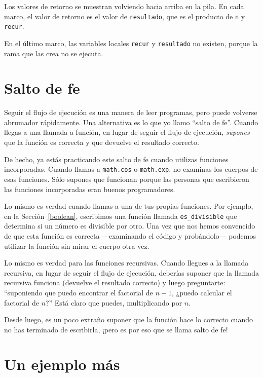 \documentclass[10pt]{book}
\begin{document}
Los valores de retorno se muestran volviendo hacia arriba en la pila.  En cada
marco, el valor de retorno es el valor de {\tt resultado}, que es el
producto de {\tt n} y {\tt recur}.

En el último marco, las variables
locales {\tt recur} y {\tt resultado} no existen, porque
la rama que las crea no se ejecuta.


\section{Salto de fe}

Seguir el flujo de ejecución es una manera de leer programas, pero
puede volverse abrumador rápidamente.  Una
alternativa es lo que yo llamo ``salto de fe''.  Cuando llegas a una
llamada a función, en lugar de seguir el flujo de ejecución, {\em
supones} que la función es correcta y que devuelve el resultado
correcto.

De hecho, ya estás practicando este salto de fe cuando utilizas
funciones incorporadas.  Cuando llamas a {\tt math.cos} o {\tt math.exp},
no examinas los cuerpos de esas funciones.  Sólo
supones que funcionan porque las personas que escribieron las funciones
incorporadas eran buenos programadores.

Lo mismo es verdad cuando llamas a una de tus propias funciones.  Por
ejemplo, en la Sección~\ref{boolean}, escribimos una función llamada
\verb"es_divisible" que determina si un número es divisible por
otro.  Una vez que nos hemos convencido de que esta función es
correcta ---examinando el código y probándolo--- podemos utilizar la función
sin mirar el cuerpo otra vez.

Lo mismo es verdad para las funciones recursivas.  Cuando llegues a la llamada
recursiva, en lugar de seguir el flujo de ejecución, deberías suponer
que la llamada recursiva funciona (devuelve el resultado correcto) y luego
preguntarte: ``suponiendo que puedo encontrar el factorial de $n-1$, ¿puedo
calcular el factorial de $n$?''  Está claro que
puedes, multiplicando por $n$.

Desde luego, es un poco extraño suponer que la función hace lo
correcto cuando no has terminado de escribirla, ¡pero es por eso
que se llama salto de fe!


\section{Un ejemplo más}
\label{one.more.example}
\end{document}
